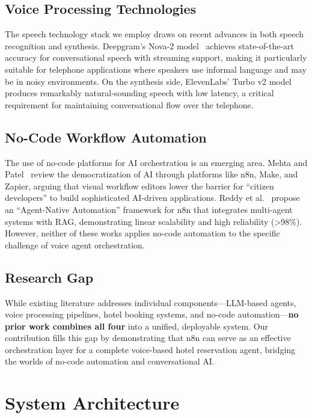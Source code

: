\documentclass[conference]{IEEEtran}
\begin{document}
\subsection{Voice Processing Technologies}

The speech technology stack we employ draws on recent advances in both speech recognition and synthesis. Deepgram's Nova-2 model~\cite{deepgram2024nova} achieves state-of-the-art accuracy for conversational speech with streaming support, making it particularly suitable for telephone applications where speakers use informal language and may be in noisy environments. On the synthesis side, ElevenLabs' Turbo v2 model~\cite{elevenlabs2024} produces remarkably natural-sounding speech with low latency, a critical requirement for maintaining conversational flow over the telephone.

\subsection{No-Code Workflow Automation}

The use of no-code platforms for AI orchestration is an emerging area. Mehta and Patel~\cite{mehta2025nocode} review the democratization of AI through platforms like n8n, Make, and Zapier, arguing that visual workflow editors lower the barrier for ``citizen developers'' to build sophisticated AI-driven applications. Reddy et al.~\cite{reddy2025agentnative} propose an ``Agent-Native Automation'' framework for n8n that integrates multi-agent systems with RAG, demonstrating linear scalability and high reliability (\textgreater 98\%). However, neither of these works applies no-code automation to the specific challenge of voice agent orchestration.

\subsection{Research Gap}

While existing literature addresses individual components---LLM-based agents, voice processing pipelines, hotel booking systems, and no-code automation---\textbf{no prior work combines all four} into a unified, deployable system. Our contribution fills this gap by demonstrating that n8n can serve as an effective orchestration layer for a complete voice-based hotel reservation agent, bridging the worlds of no-code automation and conversational AI.

\section{System Architecture}
\end{document}
